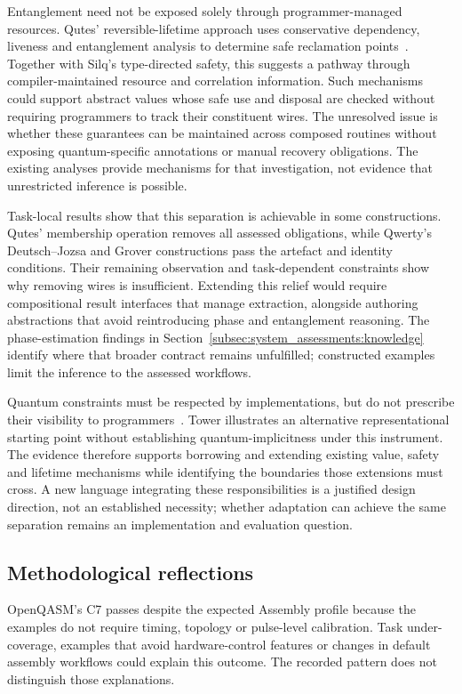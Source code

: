 Entanglement need not be exposed solely through programmer-managed resources.
Qutes' reversible-lifetime approach uses conservative dependency, liveness and entanglement analysis to determine safe reclamation points~\cite{reversiblelifetime2026}.
Together with Silq's type-directed safety, this suggests a pathway through compiler-maintained resource and correlation information.
Such mechanisms could support abstract values whose safe use and disposal are checked without requiring programmers to track their constituent wires.
The unresolved issue is whether these guarantees can be maintained across composed routines without exposing quantum-specific annotations or manual recovery obligations.
The existing analyses provide mechanisms for that investigation, not evidence that unrestricted inference is possible.

Task-local results show that this separation is achievable in some constructions.
Qutes' membership operation removes all assessed obligations, while Qwerty's Deutsch--Jozsa and Grover constructions pass the artefact and identity conditions.
Their remaining observation and task-dependent constraints show why removing wires is insufficient.
Extending this relief would require compositional result interfaces that manage extraction, alongside authoring abstractions that avoid reintroducing phase and entanglement reasoning.
The phase-estimation findings in Section~\ref{subsec:system_assessments:knowledge} identify where that broader contract remains unfulfilled; constructed examples limit the inference to the assessed workflows.

Quantum constraints must be respected by implementations, but do not prescribe their visibility to programmers~\cite{yuan2025foundationalabstractions}.
Tower illustrates an alternative representational starting point without establishing quantum-implicitness under this instrument.
The evidence therefore supports borrowing and extending existing value, safety and lifetime mechanisms while identifying the boundaries those extensions must cross.
A new language integrating these responsibilities is a justified design direction, not an established necessity; whether adaptation can achieve the same separation remains an implementation and evaluation question.

\subsection{Methodological reflections}\label{subsec:discussion:methodological_reflections}
OpenQASM's C7 passes despite the expected Assembly profile because the examples do not require timing, topology or pulse-level calibration.
Task under-coverage, examples that avoid hardware-control features or changes in default assembly workflows could explain this outcome.
The recorded pattern does not distinguish those explanations.

